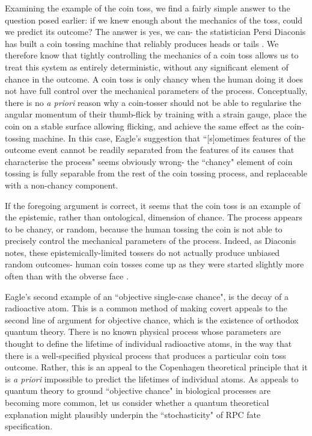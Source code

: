 Examining the example of the coin toss, we find a fairly simple answer to the question posed earlier: if we knew enough about the mechanics of the toss, could we predict its outcome? The answer is yes, we can- the statistician Persi Diaconis has built a coin tossing machine that reliably produces heads or tails \cite{Kestenbaum2004}. We therefore know that tightly controlling the mechanics of a coin toss allows us to treat this system as entirely deterministic, without any significant element of chance in the outcome. A coin toss is only chancy when the human doing it does not have full control over the mechanical parameters of the process. Conceptually, there is no \textit{a priori} reason why a coin-tosser should not be able to regularise the angular momentum of their thumb-flick by training with a strain gauge, place the coin on a stable surface allowing flicking, and achieve the same effect as the coin-tossing machine. In this case, Eagle's suggestion that ``[s]ometimes features of the outcome event cannot be readily separated from the features of its causes that characterise the process" seems obviously wrong- the ``chancy" element of coin tossing is fully separable from the rest of the coin tossing process, and replaceable with a non-chancy component.

If the foregoing argument is correct, it seems that the coin toss is an example of the epistemic, rather than ontological, dimension of chance. The process appears to be chancy, or random, because the human tossing the coin is not able to precisely control the mechanical parameters of the process. Indeed, as Diaconis notes, these epistemically-limited tossers do not actually produce unbiased random outcomes- human coin tosses come up as they were started slightly more often than with the obverse face \cite{Diaconis2007}.

Eagle's second example of an ``objective single-case chance", is the decay of a radioactive atom. This is a common method of making covert appeals to the second line of argument for objective chance, which is the existence of orthodox quantum theory. There is no known physical process whose parameters are thought to define the lifetime of individual radioactive atoms, in the way that there is a well-specified physical process that produces a particular coin toss outcome. Rather, this is an appeal to the Copenhagen theoretical principle that it is \textit{a priori} impossible to predict the lifetimes of individual atoms. As appeals to quantum theory to ground ``objective chance" in biological processes are becoming more common, let us consider whether a quantum theoretical explanation might plausibly underpin the ``stochasticity" of RPC fate specification.

